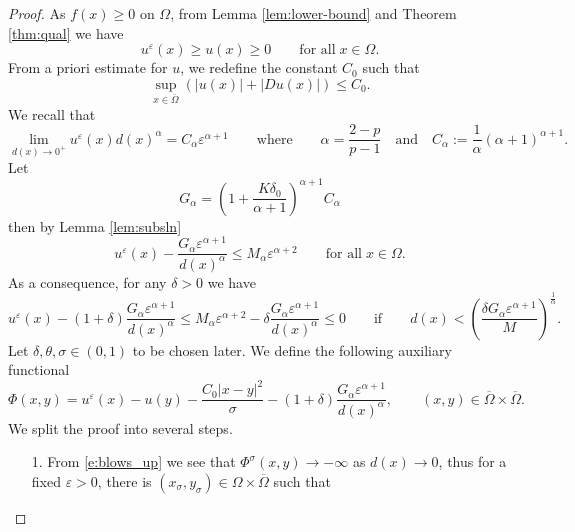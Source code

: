 \documentclass[11pt,reqno]{amsart}
\numberwithin{figure}{section}
\theoremstyle{plain}
\theoremstyle{remark}
\numberwithin{equation}{section}
\begin{document}
\begin{proof} As $f(x)\geq 0$ on $\Omega$, from Lemma \ref{lem:lower-bound} and Theorem \ref{thm:qual} we have 
\begin{equation}\label{e:low}
    u^\varepsilon(x) \geq u(x) \geq 0 \qquad\text{for all}\;x\in \Omega.
\end{equation}
From a priori estimate for $u$, we redefine the constant $C_0$ such that
\begin{equation}\label{e:priori}
    \sup_{x\in \overline{\Omega}} \left(\left| u(x)\right| + \left|Du(x)\right|\right)  \leq C_0.
\end{equation}
We recall that
\begin{equation}\label{e:behavior_ueps}
    \lim_{d(x)\to 0^+} u^\varepsilon(x)d(x)^\alpha = C_\alpha \varepsilon^{\alpha+1} \qquad\text{where}\qquad \alpha = \frac{2-p}{p-1} \quad\text{and}\quad C_\alpha := \frac{1}{\alpha}(\alpha+1)^{\alpha+1}.
\end{equation}
Let
\begin{equation*}
    G_\alpha = \left(1+\frac{K\delta_0}{\alpha+1}\right)^{\alpha+1}C_\alpha
\end{equation*}
then by Lemma \ref{lem:subsln}
\begin{equation*}
    u^\varepsilon(x) - \frac{G_\alpha\varepsilon^{\alpha+1}}{d(x)^\alpha} \leq M_\alpha\varepsilon^{\alpha+2} \qquad\text{for all}\; x\in \Omega.
\end{equation*}
As a consequence, for any $\delta>0$ we have
\begin{equation*}
    u^\varepsilon(x) - (1+\delta) \frac{G_\alpha \varepsilon^{\alpha+1}}{d(x)^{\alpha}} \leq  M_\alpha\varepsilon^{\alpha+2} - \delta\frac{G_\alpha \varepsilon^{\alpha+1}}{d(x)^{\alpha}}\leq 0 \qquad\text{if}\qquad d(x)< \left(\frac{\delta G_\alpha\varepsilon^{\alpha+1}}{M}\right)^{\frac{1}{\alpha}}.
\end{equation*}
Let $\delta,\theta,\sigma\in (0,1)$ to be chosen later. We define the following auxiliary functional
\begin{equation*}
    \Phi(x,y) =  u^\varepsilon(x) - u(y) - \frac{C_0|x-y|^2}{\sigma}- \left(1+\delta\right)\frac{G_\alpha\varepsilon^{\alpha+1}}{d(x)^{\alpha}}, \qquad (x,y)\in \overline{\Omega}\times\overline{\Omega}.
\end{equation*}
We split the proof into several steps.
\begin{enumerate}
    \item[1.] From \eqref{e:blows_up} we see that $\Phi^\sigma(x,y)\to -\infty$ as $d(x)\to 0$, thus for a fixed $\varepsilon>0$, there is $(x_{\sigma},y_\sigma)\in \Omega\times\overline{\Omega}$ such that 

\end{enumerate}
\end{proof}
\end{document}
